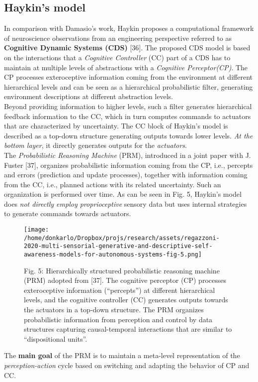 \documentclass{article}
\begin{document}
		\subsection{Haykin’s model}
		In comparison with Damasio’s work, Haykin proposes a computational framework of neuroscience observations from an engineering perspective referred to as \textbf{Cognitive Dynamic Systems (CDS)} \citet{regazzoni-2020-multi-sensorial-generative-and-descriptive-self-awareness-models-for-autonomous-systems}[36]. The proposed CDS model is based on the interactions that a \emph{Cognitive Controller} (CC) part of a CDS has to maintain at multiple levels of abstractions with a \emph{Cognitive Perceptor(CP)}.  The CP processes exteroceptive information coming from the environment at different hierarchical levels and can be seen as a hierarchical probabilistic filter, generating environment descriptions at different abstraction levels.
		\\
		Beyond providing information to higher levels, such a filter generates hierarchical feedback information to the CC, which in turn computes commands to actuators that are characterized by uncertainty. The CC block of Haykin’s model is described as a top-down structure generating outputs towards lower levels. \emph{At the bottom layer}, it directly generates outputs for the \emph{actuators}.
		\\
		The \emph{Probabilistic Reasoning Machine} (PRM), introduced in a joint paper with J. Fuster [37], organizes probabilistic information coming from the CP, i.e., percepts and errors (prediction and update processes), together with information coming from the CC, i.e., planned actions with its related
		uncertainty. Such an organization is performed over time. As can be seen in Fig. 5, Haykin’s model does \emph{not directly employ proprioceptive} sensory data but uses internal strategies to generate commands towards actuators.
		\begin{figure*}
			\centering
			\texttt{[image: /home/donkarlo/Dropbox/projs/research/assets/regazzoni-2020-multi-sensorial-generative-and-descriptive-self-awareness-models-for-autonomous-systems-fig-5.png]}
			\caption{Fig. 5: Hierarchically structured probabilistic reasoning machine (PRM) adopted from [37]. The cognitive perceptor (CP) processes exteroceptive information (“percepts”) at different hierarchical levels, and the cognitive controller (CC) generates outputs towards the actuators in a top-down structure. The PRM organizes probabilistic information from perception and control by data structures capturing causal-temporal interactions that are similar to “dispositional units”.
			}
			\label{fig:regazzoni-2020-multi-sensorial-generative-and-descriptive-self-awareness-models-for-autonomous-systems-fig-5.png}
		\end{figure*}
		The \textbf{main goal} of the PRM is to maintain a meta-level representation of the \emph{perception-action} cycle based on switching and adapting the behavior of CP and CC.
		
\end{document}
